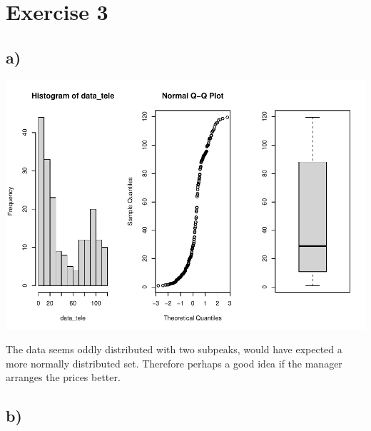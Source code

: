 \documentclass[
]{article}
\newenvironment{Shaded}{\begin{snugshade}}{\end{snugshade}}
\newcommand{\AttributeTok}[1]{\textcolor[rgb]{0.77,0.63,0.00}{#1}}
\newcommand{\ConstantTok}[1]{\textcolor[rgb]{0.00,0.00,0.00}{#1}}
\newcommand{\DecValTok}[1]{\textcolor[rgb]{0.00,0.00,0.81}{#1}}
\newcommand{\FunctionTok}[1]{\textcolor[rgb]{0.00,0.00,0.00}{#1}}
\newcommand{\NormalTok}[1]{#1}
\newcommand{\OtherTok}[1]{\textcolor[rgb]{0.56,0.35,0.01}{#1}}
\newcommand{\SpecialCharTok}[1]{\textcolor[rgb]{0.00,0.00,0.00}{#1}}
\newcommand{\StringTok}[1]{\textcolor[rgb]{0.31,0.60,0.02}{#1}}
\begin{document}
\hypertarget{exercise-3}{%
\section{Exercise 3}\label{exercise-3}}

\hypertarget{a-1}{%
\subsection{a)}\label{a-1}}

\begin{Shaded}
\end{Shaded}

\includegraphics{Assignment-1_files/figure-latex/unnamed-chunk-7-1.pdf}

The data seems oddly distributed with two subpeaks, would have expected
a more normally distributed set. Therefore perhaps a good idea if the
manager arranges the prices better.

\hypertarget{b-1}{%
\subsection{b)}\label{b-1}}
\end{document}
